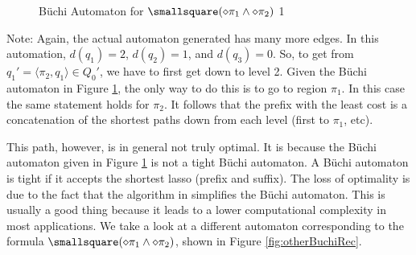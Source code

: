 \begin{figure}
\centering
{}
\caption{B\"uchi Automaton for $\smallsquare(\diamond \pi_1 \land \diamond \pi_2 )$ 1}
\label{fig:gasBuchiRec}
\end{figure}
Note: Again, the actual automaton generated has many more edges. %
In this automation, $d(q_1)=2$, $d(q_2)=1$, and $d(q_3)=0$. So, to get from $q_{1}' = \langle \pi_2, q_1 \rangle \in Q_0'$, we have to first get down to level 2. Given the B\"{u}chi automaton in Figure \ref{fig:gasBuchiRec}, the only way to do this is to go to region $\pi_1$.  In this case the same statement holds for $\pi_2$. It follows that the prefix with the least cost is a concatenation of the shortest paths down from each level (first to $\pi_1$, etc).


This path, however, is in general not truly optimal. It is because the B\"{u}chi automaton given in Figure \ref{fig:gasBuchiRec} is not a tight B\"{u}chi automaton. A B\"{u}chi automaton is tight if it accepts the shortest lasso (prefix and suffix). The loss of optimality is due to the fact that the algorithm in \cite{gastin01} simplifies the B\"{u}chi automaton. This is usually a good thing because it leads to a lower computational complexity in most applications. We take a look at a different automaton corresponding to the formula $\smallsquare(\diamond \pi_1 \land \diamond \pi_2)$, shown in Figure \ref{fig:otherBuchiRec}. 

